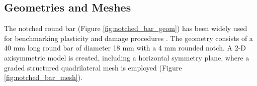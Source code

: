 \documentclass[sn-mathphys,Numbered]{sn-jnl}%
\begin{document}




\subsection{Geometries and Meshes}
The notched round bar (Figure \ref{fig:notched_bar_geom}) has been widely used for benchmarking plasticity and damage procedures \cite{cesar_de_sa_damage_2006, fincato_return_2018, vaz_aspects_2001}.
The geometry consists of a 40 \si{\milli\meter} long round bar of diameter 18 \si{\milli\meter} with a 4 \si{\milli\meter} rounded notch.
A 2-D axisymmetric model is created, including a horizontal symmetry plane, where a graded structured quadrilateral mesh is employed (Figure \ref{fig:notched_bar_mesh}).

\end{document}
